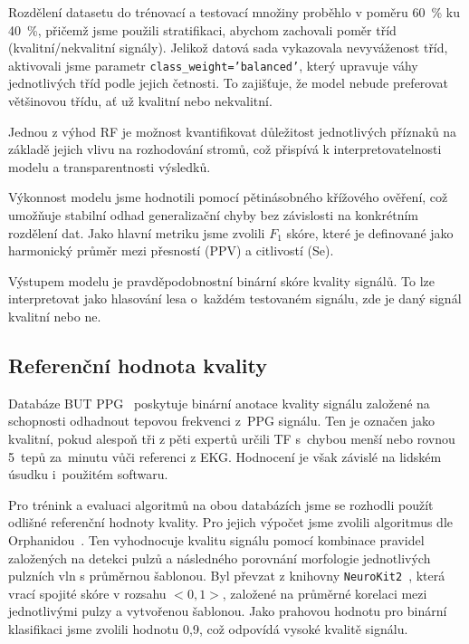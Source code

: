 Rozdělení datasetu do trénovací a testovací množiny proběhlo v poměru 60~\% ku 40~\%, přičemž jsme použili stratifikaci, abychom zachovali poměr tříd (kvalitní/nekvalitní signály).
Jelikož datová sada vykazovala nevyváženost tříd, aktivovali jsme parametr \texttt{class\_weight='balanced'}, který upravuje váhy jednotlivých tříd podle jejich četnosti.
To zajišťuje, že model nebude preferovat většinovou třídu, ať už kvalitní nebo nekvalitní.

Jednou z výhod \acs{RF} je možnost kvantifikovat důležitost jednotlivých příznaků na základě jejich vlivu na rozhodování stromů, což přispívá k interpretovatelnosti modelu a transparentnosti výsledků.

Výkonnost modelu jsme hodnotili pomocí pětinásobného křížového ověření, což umožňuje stabilní odhad generalizační chyby bez závislosti na konkrétním rozdělení dat.
Jako hlavní metriku jsme zvolili $F_1$ skóre, které je definované jako harmonický průměr mezi přesností (\acs{PPV}) a citlivostí (\acs{Se}).

Výstupem modelu je pravděpodobnostní binární skóre kvality signálů.
To lze interpretovat jako hlasování lesa o~každém testovaném signálu, zde je daný signál kvalitní nebo ne.

\subsection*{Referenční hodnota kvality}
\label{subsec:referencni_hodnota_kvality}
Databáze \acs{BUT PPG}~\cite{BUT_PPG,BUT_PPG_database} poskytuje binární anotace kvality signálu založené na schopnosti odhadnout tepovou frekvenci z~\acs{PPG} signálu.
Ten je označen jako kvalitní, pokud alespoň tři z pěti expertů určili \acs{TF} s~chybou menší nebo rovnou 5~tepů za~minutu vůči referenci z \acs{EKG}.
Hodnocení je však závislé na lidském úsudku i~použitém softwaru.

Pro trénink a evaluaci algoritmů na obou databázích jsme se rozhodli použít odlišné referenční hodnoty kvality.
Pro jejich výpočet jsme zvolili algoritmus dle Orphanidou~\cite{Orphanidou2015,NeuroKit2}.
Ten vyhodnocuje kvalitu signálu pomocí kombinace pravidel založených na detekci pulzů a následného porovnání morfologie jednotlivých pulzních vln s průměrnou šablonou. %
Byl převzat z knihovny \texttt{NeuroKit2}~\cite{NeuroKit2}, která vrací spojité skóre v rozsahu $<0, 1>$, založené na průměrné korelaci mezi jednotlivými pulzy a vytvořenou šablonou.
Jako prahovou hodnotu pro binární klasifikaci jsme zvolili hodnotu 0,9, což odpovídá vysoké kvalitě signálu.

